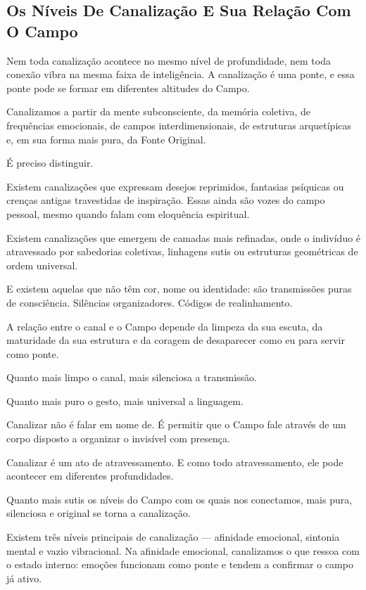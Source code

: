 \documentclass[12pt]{book}
\begin{document}
\subsection*{Os Níveis De Canalização E Sua Relação Com O Campo}

Nem toda canalização acontece no mesmo nível de profundidade, nem toda conexão vibra na mesma faixa de inteligência. A canalização é uma ponte, e essa ponte pode se formar em diferentes altitudes do Campo.

Canalizamos a partir da mente subconsciente, da memória coletiva, de frequências emocionais, de campos interdimensionais, de estruturas arquetípicas e, em sua forma mais pura, da Fonte Original.

É preciso distinguir.

Existem canalizações que expressam desejos reprimidos, fantasias psíquicas ou crenças antigas travestidas de inspiração. Essas ainda são vozes do campo pessoal, mesmo quando falam com eloquência espiritual.

Existem canalizações que emergem de camadas mais refinadas, onde o indivíduo é atravessado por sabedorias coletivas, linhagens sutis ou estruturas geométricas de ordem universal.

E existem aquelas que não têm cor, nome ou identidade: são transmissões puras de consciência. Silências organizadores. Códigos de realinhamento.

A relação entre o canal e o Campo depende da limpeza da sua escuta, da maturidade da sua estrutura e da coragem de desaparecer como eu para servir como ponte.

Quanto mais limpo o canal, mais silenciosa a transmissão.

Quanto mais puro o gesto, mais universal a linguagem.

Canalizar não é falar em nome de. É permitir que o Campo fale através de um corpo disposto a organizar o invisível com presença.

Canalizar é um ato de atravessamento. E como todo atravessamento, ele pode acontecer em diferentes profundidades.

Quanto mais sutis os níveis do Campo com os quais nos conectamos, mais pura, silenciosa e original se torna a canalização.

Existem três níveis principais de canalização --- afinidade emocional, sintonia mental e vazio vibracional. Na afinidade emocional, canalizamos o que ressoa com o estado interno: emoções funcionam como ponte e tendem a confirmar o campo já ativo.
\end{document}
